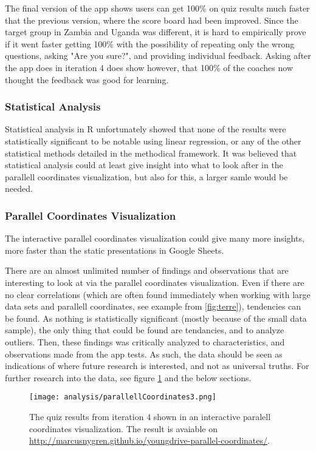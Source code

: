 The final version of the app shows users can get 100\% on quiz results much faster that the previous version, where the score board had been improved. Since the target group in Zambia and Uganda was different, it is hard to empirically prove if it went faster getting 100\% with the possibility of repeating only the wrong questions, asking "Are you sure?", and providing individual feedback. Asking after the app does in iteration 4 does show however, that 100\% of the coaches now thought the feedback was good for learning.

\subsubsection{Statistical Analysis}
Statistical analysis in R unfortunately showed that none of the results were statistically significant to be notable using linear regression, or any of the other statistical methods detailed in the methodical framework. It was believed that statistical analysis could at least give insight into what to look after in the parallell coordinates visualization, but also for this, a larger samle would be needed.

\subsubsection{Parallel Coordinates Visualization}
The interactive parallel coordinates visualization could give many more insights, more faster than the static presentations in Google Sheets.

There are an almost unlimited number of findings and observations that are interesting to look at via the parallel coordinates visualization. Even if there are no clear correlations (which are often found immediately when working with large data sets and parallell coordinates, see example from \ref{fig:terre}), tendencies can be found. As nothing is statistically significant (mostly because of the small data sample), the only thing that could be found are tendancies, and to analyze outliers. Then, these findings was critically analyzed to characteristics, and observations made from the app tests. As such, the data should be seen as indications of where future research is interested, and not as universal truths. For further research into the data, see figure \ref{fig:parallellCoordinates3} and the below sections.

\begin{figure}[h]
    \centering
    \texttt{[image: analysis/parallellCoordinates3.png]}
    \caption{The quiz results from iteration 4 shown in an interactive paralell coordinates visualization. The result is avaiable on \url{http://marcusnygren.github.io/youngdrive-parallel-coordinates/}.}
    \label{fig:parallellCoordinates3}
\end{figure}

